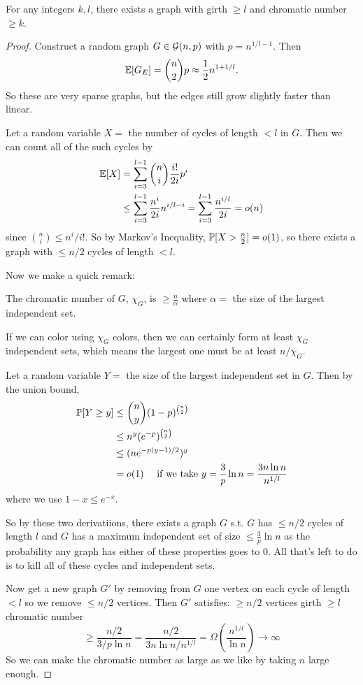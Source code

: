\documentclass[11 pt]{scrartcl}
\begin{document}
\begin{theorem}
    For any integers $k,l$, there exists a graph with girth $\geq l$ and chromatic number $\geq k$. 
\end{theorem}
\begin{proof}
    Construct a random graph $G \in \mathcal G (n,p)$ with $p = n^{1/l - 1}$. Then 
    \[ \mathbb E[G_E] =  \binom{n}{2} p \approx \frac{1}{2} n^{1 + 1/l}.\]
    So these are very sparse graphs, but the edges still grow slightly faster than linear. 

    Let a random variable $X = $ the number of cycles of length $< l$ in $G$. Then we can count all of the such cycles by 
    \begin{align*}
        \mathbb E[X] &= \sum_{i = 3}^{l-1} \dbinom{n}{i} \dfrac{i!}{2i} p^i \\ 
               &\leq \sum_{i=3}^{l-1} \dfrac{n^i}{2i} n^{i/l - i} =  \sum_{i=3}^{l-1} \dfrac{n^{i/l}}{2i} = o(n) 
    \end{align*}
    since $\binom{n}{i} \leq n^i/i!$. So by Markov's Inequality, $\mathbb P[X > \frac{n}{2}] = o(1)$, so there exists a graph with $\leq n/2$ cycles of length $< l$.

    Now we make a quick remark: 
    \begin{lemma}
        The chromatic number of $G$, $\chi_G$, is $\geq \frac{n}{\alpha}$ where $\alpha = $ the size of the largest independent set.
    \end{lemma}
    If we can color using $\chi_G$ colors, then we can certainly form at least $\chi_G$ independent sets, which means the largest one must be at least $n/\chi_G$. 

    Let a random variable $Y = $ the size of the largest independent set in $G$. Then by the union bound, 
    \begin{align*} 
        \mathbb P[Y \geq y]  &\leq \dbinom{n}{y} (1-p)^{\binom{n}{2}} \\
                       &\leq n^y (e^{-p})^{\binom{n}{2}} \\ 
                       &\leq (ne^{-p(y-1)/2})^y \\ 
                       &= o(1) \quad \text{ if we take } y = \frac{3}{p} \ln n = \dfrac{3n\ln n}{n^{1/l}}
    \end{align*}
    where we use $1-x \leq e^{-x}$. 

    So by these two derivatiions, there exists a graph $G$ s.t. 
    \alphanum
        \ii $G$ has $\leq n/2$ cycles of length $l$ and 
        \ii $G$ has a maximum independent set of size $\leq \frac{3}{p} \ln n$
    \enumend
    as the probability any graph has either of these properties goes to 0. All that's left to do is to kill all of these cycles and independent sets. 

    Now get a new graph $G'$ by removing from $G$ one vertex on each cycle of length $< l$ so we remove $\leq n/2$ vertices. Then $G'$ satisfies: 
\itemnum
    \ii $\geq n/2$ vertices 
    \ii girth $\geq l$ 
    \ii chromatic number 
    \[ \geq \dfrac{n/2}{3/p \ln n} = \dfrac{n/2}{3n\ln n/n^{1/l}} = \Omega(\dfrac{n^{1/l}}{\ln n}) \to \infty \]
\itemend
    So we can make the chromatic number as large as we like by taking $n$ large enough. 
\end{proof}
\end{document}
